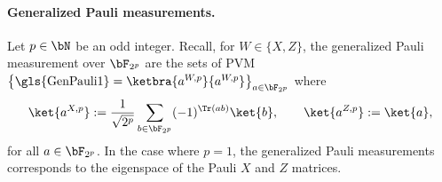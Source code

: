 \paragraph{Generalized Pauli measurements.} Let $p \in \bN$ be an odd integer. Recall, for $W \in \{X,Z\}$, the generalized Pauli measurement over $\bF_{2^p}$ are the sets of PVM  $\left\{\text{\gls{GenPauli1}} = \ketbra{a^{W, p}}{a^{W, p}} \right\}_{a \in \bF_{2^{p}}}$ where 
\begin{equation*}
	\ket{a^{X, p}} := \frac{1}{\sqrt{2^{p}}} \sum_{b \in \bF_{2^p}} (-1)^{\Tr(ab)}  \ket{b}, \qquad \ket{a^{Z, p}} := \ket{a},
\end{equation*}
for all $a \in \bF_{2^{p}}$. In the case where $p = 1$, the generalized Pauli measurements corresponds to the eigenspace of the Pauli $X$ and $Z$ matrices.

